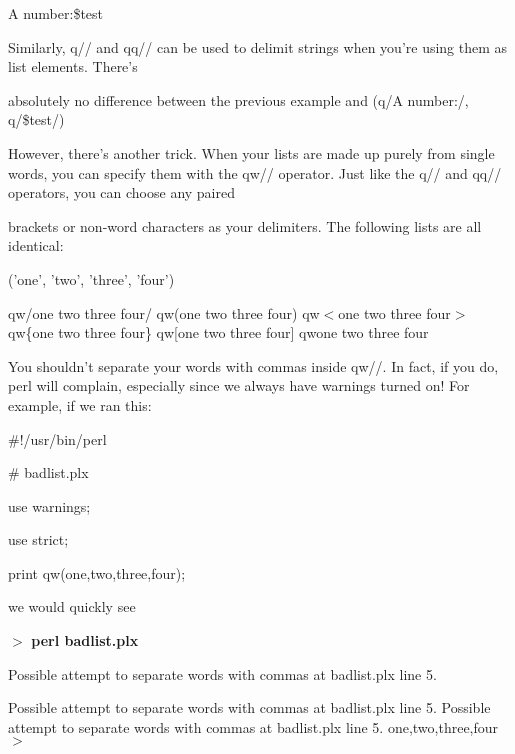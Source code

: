 \documentclass[a4paper,11pt]{book}
\begin{document}
\noindent A number:\$test

\noindent 

\noindent 

\noindent Similarly, q// and qq// can be used to delimit strings when you're using them as list elements. There's

\noindent absolutely no difference between the previous example and (q/A number:/, q/\$test/)

\noindent 

\noindent However, there's another trick. When your lists are made up purely from single words, you can specify them with the qw// operator. Just like the q// and qq// operators, you can choose any paired

\noindent brackets or non-word characters as your delimiters. The following lists are all identical:

\noindent 

\noindent 

\noindent ('one', 'two', 'three', 'four')

\noindent qw/one two three four/ qw(one two three four) qw$<$one two three four$>$ qw\{one two three four\} qw[one two three four] qw\textbar one two three four\textbar 

\noindent 

\noindent You shouldn't separate your words with commas inside qw//. In fact, if you do, perl will complain, especially since we always have warnings turned on! For example, if we ran this:

\noindent 

\noindent 

\noindent \#!/usr/bin/perl

\noindent \# badlist.plx

\noindent use warnings;

\noindent use strict;

\noindent print qw(one,two,three,four);

\noindent 

\noindent we would quickly see

\noindent 

\noindent $>$ \textbf{perl badlist.plx}

\noindent Possible attempt to separate words with commas at badlist.plx line 5.

\noindent Possible attempt to separate words with commas at badlist.plx line 5. Possible attempt to separate words with commas at badlist.plx line 5. one,two,three,four$>$
\end{document}
